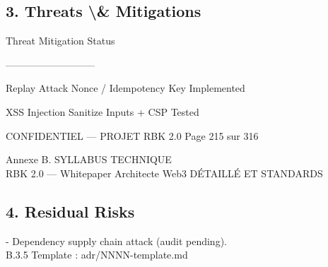 \documentclass[12pt,landscape,a4paper]{article}
\newenvironment{confidential}
{\begin{tcolorbox}[
    colback=rbkred!5!white,
    colframe=rbkred!75!black,
    title=CONFIDENTIEL,
    fonttitle=\bfseries\color{white},
    coltitle=rbkred!75!black,
    breakable,
    enhanced,
    frame hidden,
    borderline west={2pt}{0pt}{rbkred!75!black}
]}
{\end{tcolorbox}}
\begin{document}
\subsection*{3. Threats \textbackslash{}& Mitigations}
\begin{center}\begin{tabular}\textbar{} Threat \textbar{} Mitigation \textbar{} Status \textbar{}\end{tabular}\end{center}
\begin{center}\begin{tabular}\textbar{}--------\textbar{}------------\textbar{}--------\textbar{}\end{tabular}\end{center}
\begin{center}\begin{tabular}\textbar{} Replay Attack \textbar{} Nonce / Idempotency Key \textbar{} Implemented \textbar{}\end{tabular}\end{center}
\begin{center}\begin{tabular}\textbar{} XSS Injection \textbar{} Sanitize Inputs + CSP     \textbar{} Tested \textbar{}\end{tabular}\end{center}
\vspace{0.5em}
\vspace{0.5em}
\vspace{0.5em}
\vspace{0.5em}
\begin{confidential}CONFIDENTIEL — PROJET RBK 2.0                      Page 215 sur 316\end{confidential}
Annexe B. SYLLABUS TECHNIQUE\\
RBK 2.0 — Whitepaper Architecte Web3                                                  DÉTAILLÉ ET STANDARDS\\
\vspace{0.5em}
\vspace{0.5em}
\subsection*{4. Residual Risks}
- Dependency supply chain attack (audit pending).\\
\vspace{0.5em}
\vspace{0.5em}
B.3.5 Template : adr/NNNN-template.md\\
\end{document}
